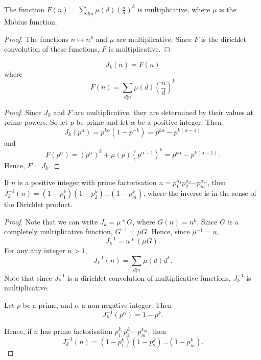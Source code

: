\documentclass{unswmaths}
\begin{document}
\begin{lemma}
    The function $F(n) = \sum_{d|n}\mu(d)\left(\frac{n}{d}\right)^k$ is multiplicative, where 
    $\mu$ is the M\"obius function.
\end{lemma}
\begin{proof}
    The functions $n\mapsto n^k$ and $\mu$ are multiplicative.
    Since $F$ is the dirichlet convolution of these functions, $F$
    is multiplicative.    
\end{proof}
\begin{theorem}
    \begin{equation*}
        J_k(n) = F(n)
    \end{equation*}
    where 
    \begin{equation*}
        F(n) = \sum_{d|n} \mu(d)\left(\frac{n}{d}\right)^k
    \end{equation*}
\end{theorem}
\begin{proof}
    Since $J_k$ and $F$ are multiplicative, they are determined by their values at prime powers. So let $p$ be prime
    and let $\alpha$ be a positive integer. Then
    \begin{equation*}
        J_k(p^\alpha) = p^{k\alpha}(1-p^{-k}) = p^{k\alpha}-p^{k(\alpha-1)}
    \end{equation*}
    and
    \begin{equation*}
        F(p^\alpha) = (p^\alpha)^k+\mu(p)(p^{\alpha-1})^k = p^{k\alpha}-p^{k(\alpha-1)}.
    \end{equation*}
    Hence, $F = J_k$.
\end{proof}
\begin{theorem}
    If $n$ is a positive integer with prime factorisation $n = p_1^{\alpha_1}p_2^{\alpha_2}\cdots p_m^{\alpha_m}$, 
    then $J_k^{-1}(n) = (1-p_1^k)(1-p_2^k)\ldots(1-p_m^k)$, where the inverse is in the sense of the Dirichlet product.
\end{theorem}
\begin{proof}
    Note that we can write $J_k = \mu * G$, where $G(n) = n^k$. Since $G$ is a completely multiplicative
    function, $G^{-1} = \mu G$. Hence, since $\mu^{-1} = u$,
    \begin{equation*}
        J_k^{-1} = u*(\mu G).
    \end{equation*} 
    For any any integer $n>1$, 
    \begin{equation*}
        J_k^{-1}(n) = \sum_{d|n} \mu(d)d^k.
    \end{equation*}
    Note that since $J_k^{-1}$ is a dirichlet convolution of multiplicative functions, $J_k^{-1}$ is multiplicative.
    
    Let $p$ be a prime, and $\alpha$ a non negative integer. Then
    \begin{equation*}
        J_k^{-1}(p^\alpha) = 1-p^k.
    \end{equation*}
    
    Hence, if $n$ has prime factorisation $p_1^{k_1}p_2^{k_2}\cdots p_m^{k_m}$, then
    \begin{equation*}
        J_k^{-1}(n) = (1-p_1^{k})(1-p_2^{k})\ldots(1-p_m^{k}).
    \end{equation*}
\end{proof}
\end{document}
